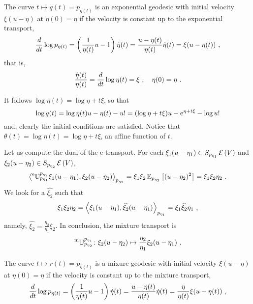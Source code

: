 \documentclass[12pt,a4paper]{amsart}
\begin{document}
The curve $t \mapsto q(t) = p_{\eta(t)}$ is an exponential geodesic with initial velocity $\xi (u - \eta)$ at $\eta(0) = \eta$ if the velocity is constant up to the exponential transport,
\begin{equation}
  \label{eq:15}
  \derivby t \log p_{\eta(t)} = \left(\frac 1 {\eta(t)} u - 1\right) \dot \eta(t) = \frac {u - \eta(t)} {\eta(t)} \dot \eta(t)=  \xi (u - \eta(t)) \ ,  
\end{equation}
that is,
\begin{equation}
  \label{eq:16}
  \frac {\dot \eta(t)} {\eta(t)} = \derivby t \log \eta(t) = \xi \ , \quad  \eta(0) = \eta \ .
\end{equation}

It follows $\log \eta(t) = \log \eta + t \xi$, so that
\begin{equation}
  \label{eq:17}
  \log q(t) = \log \eta(t)u - \eta(t) - u! = (\log \eta + t \xi) u - \euler^{\eta + t \xi} - \log u!  
\end{equation}
and, clearly the initial conditions are satisfied. Notice that $\theta(t) = \log \eta(t) = \log \eta + t \xi$, an affine function of $t$.

Let us compute the dual of the e-transport. For each $\xi_1(u - \eta_1) \in S_{p_{\eta_1}}\operatorname{\mathcal E}\left(V\right)$ and $\xi_2(u - \eta_2) \in S_{p_{\eta_2}}\operatorname{\mathcal E}\left(V\right)$,
\begin{equation}
  \label{eq:4}
  \scalarat {p_{\eta_2}} {\etransport {p_{\eta_1}}{p_{\eta_2}} \xi_1(u - \eta_1)} {\xi_2(u - \eta_2)} = \xi_1 \xi_2 \expectat {p_{\eta_2}} {(u - \eta_2)^2} = \xi_1 \xi_2 \eta_2 \ .
\end{equation}
We look for a $\widehat{\xi_2}$ such that
\begin{equation}
  \label{eq:7}
  \xi_1\xi_2 \eta_2 = \scalarat {p_{\eta_1}} {\xi_1(u - \eta_1)}{\widehat{\xi_2}(u - \eta_1)} = \xi_1 \widehat{\xi_2} \eta_1 \ ,
\end{equation}
namely, $\widehat{\xi_2} = \frac {\eta_2}{\eta_1} \xi_2$. In conclusion, the mixture transport is
\begin{equation}
  \label{eq:18}
  \mtransport {p_{\eta_2}}{p_{\eta_1}} \colon \xi_2(u - \eta_2) \mapsto \frac {\eta_2}{\eta_1} \xi_2 (u - \eta_1) \ .
\end{equation}

The curve $t \mapsto r(t) = p_{\eta(t)}$ is a mixure geodesic with initial velocity $\xi (u - \eta)$ at $\eta(0) = \eta$ if the velocity is constant up to the mixture transport,
\begin{equation}
  \label{eq:19}
  \derivby t \log p_{\eta(t)} = \left(\frac 1 {\eta(t)} u - 1\right) \dot \eta(t) = \frac {u - \eta(t)} {\eta(t)} \dot \eta(t)=  \frac \eta {\eta(t)}\xi (u - \eta(t)) \ ,  
\end{equation}

% 


\end{document}
